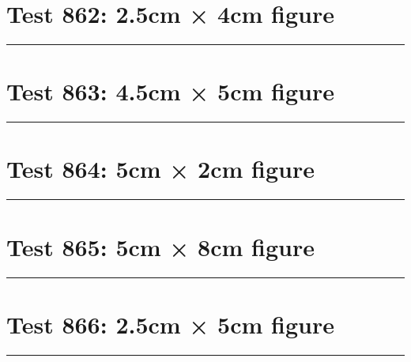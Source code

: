 \documentclass[a4paper,11pt]{article}
\begin{document}
\section*{Test 862: 2.5cm × 4cm figure}
\begin{swarmwrap}%
  \begin{minipage}[t]{2cm}
    \centering
    \rule{\linewidth}{4cm}
  \end{minipage}%
\end{swarmwrap}%
\swarmwrapnext
\lipsum[65]
\lipsum[66]
\lipsum[67]
\section*{Test 863: 4.5cm × 5cm figure}
\begin{swarmwrap}%
  \begin{minipage}[t]{4cm}
    \centering
    \rule{\linewidth}{5cm}
  \end{minipage}%
\end{swarmwrap}%
\swarmwrapnext
\lipsum[138]
\lipsum[139]
\lipsum[140]
\lipsum[141]
\lipsum[142]
\section*{Test 864: 5cm × 2cm figure}
\begin{swarmwrap}%
  \begin{minipage}[t]{5cm}
    \centering
    \rule{\linewidth}{2cm}
  \end{minipage}%
\end{swarmwrap}%
\swarmwrapnext
\lipsum[149]
\lipsum[150]
\lipsum[1]
\lipsum[2]
\section*{Test 865: 5cm × 8cm figure}
\begin{swarmwrap}%
  \begin{minipage}[t]{5cm}
    \centering
    \rule{\linewidth}{8cm}
  \end{minipage}%
\end{swarmwrap}%
\swarmwrapnext
\lipsum[46]
\lipsum[47]
\lipsum[48]
\lipsum[49]
\lipsum[50]
\section*{Test 866: 2.5cm × 5cm figure}
\begin{swarmwrap}%
  \begin{minipage}[t]{2cm}
    \centering
    \rule{\linewidth}{5cm}
  \end{minipage}%
\end{swarmwrap}%
\swarmwrapnext
\lipsum[93]
\lipsum[94]
\lipsum[95]
\lipsum[96]
\lipsum[97]
\end{document}
